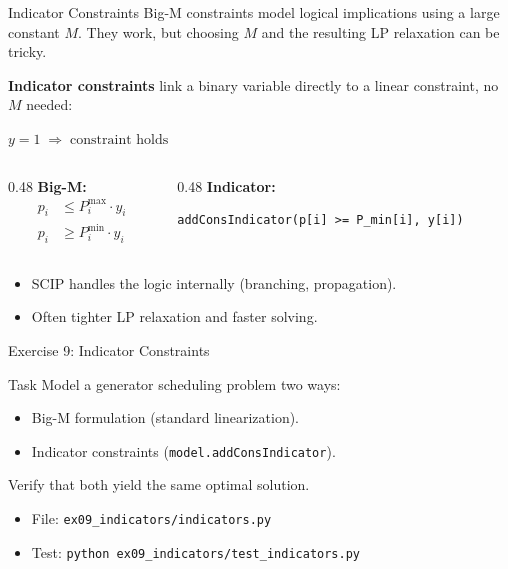 \documentclass[aspectratio=169,10pt]{beamer}
\begin{document}
\begin{frame}[fragile]{Indicator Constraints}
Big-M constraints model logical implications using a large constant $M$.
They work, but choosing $M$ and the resulting LP relaxation can be tricky.

\medskip
\textbf{Indicator constraints} link a binary variable directly to a
linear constraint, no $M$ needed:

\medskip
\begin{center}
$y = 1 \;\Rightarrow\; \text{constraint holds}$
\end{center}

\medskip
\begin{columns}[T]
\begin{column}{0.48\textwidth}
\textbf{Big-M:}
\begin{align*}
  p_i &\le P_i^{\max} \cdot y_i \\
  p_i &\ge P_i^{\min} \cdot y_i
\end{align*}
\end{column}
\begin{column}{0.48\textwidth}
\textbf{Indicator:}
\begin{lstlisting}
addConsIndicator(p[i] >= P_min[i], y[i])
\end{lstlisting}
\end{column}
\end{columns}

\medskip
\begin{itemize}
  \item SCIP handles the logic internally (branching, propagation).
  \item Often tighter LP relaxation and faster solving.
\end{itemize}
\end{frame}

\begin{frame}{Exercise 9: Indicator Constraints}
\begin{block}{Task}
Model a generator scheduling problem two ways:
\begin{itemize}
  \item Big-M formulation (standard linearization).
  \item Indicator constraints (\texttt{model.addConsIndicator}).
\end{itemize}
Verify that both yield the same optimal solution.
\end{block}
\begin{itemize}
  \item File: \texttt{ex09\_indicators/indicators.py}
  \item Test: \texttt{python ex09\_indicators/test\_indicators.py}
\end{itemize}
\end{frame}
\end{document}
